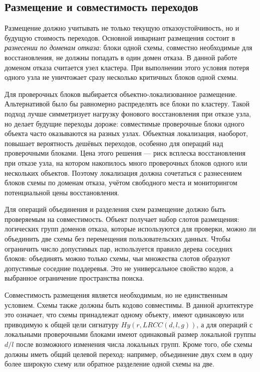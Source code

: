 \ArchitectureComponentDiagram

\subsection{Размещение и совместимость переходов}

Размещение должно учитывать не только текущую отказоустойчивость, но и будущую
стоимость переходов. Основной инвариант размещения состоит в \emph{разнесении
по доменам отказа}: блоки одной схемы, совместно необходимые для восстановления,
не должны попадать в один домен отказа. В данной работе доменом отказа считается
узел кластера. При выполнении этого условия потеря одного узла не уничтожает
сразу несколько критичных блоков одной схемы.

Для проверочных блоков выбирается объектно-локализованное размещение.
Альтернативой было бы равномерно распределять все блоки по кластеру. Такой
подход лучше симметризует нагрузку фонового восстановления при отказе узла, но
делает будущие переходы дороже: совместимые проверочные блоки одного объекта
часто оказываются на разных узлах. Объектная локализация, наоборот, повышает
вероятность дешёвых переходов, особенно для операций над проверочными блоками.
Цена этого решения --- риск всплеска восстановления при отказе узла, на котором
накопилось много проверочных блоков одного или нескольких объектов. Поэтому
локализация должна сочетаться с разнесением блоков схемы по доменам отказа,
учётом свободного места и мониторингом потенциальной цены восстановления.

Для операций объединения и разделения схем размещение должно быть проверяемым
на совместимость. Объект получает набор слотов размещения: логических групп
доменов отказа, которые используются для проверки, можно ли объединить две
схемы без перемещения пользовательских данных. Чтобы ограничить число
допустимых пар, используется правило дерева соседних блоков: объединять можно
только схемы, чьи множества слотов образуют допустимые соседние поддеревья. Это
не универсальное свойство кодов, а выбранное ограничение пространства поиска.

Совместимость размещения является необходимым, но не единственным условием.
Схемы также должны быть кодово совместимы. В данной архитектуре это означает,
что схемы принадлежат одному объекту, имеют одинаковую или приводимую к общей
цели сигнатуру \(Hy(r, LRCC(d,l,g))\), а для операций с локальными проверочными
блоками имеют одинаковый размер локальной группы \(d/l\) после возможного
изменения числа локальных групп. Кроме того, обе схемы должны иметь общий
целевой переход: например, объединение двух схем в одну более широкую схему
или обратное разделение одной схемы на две.


